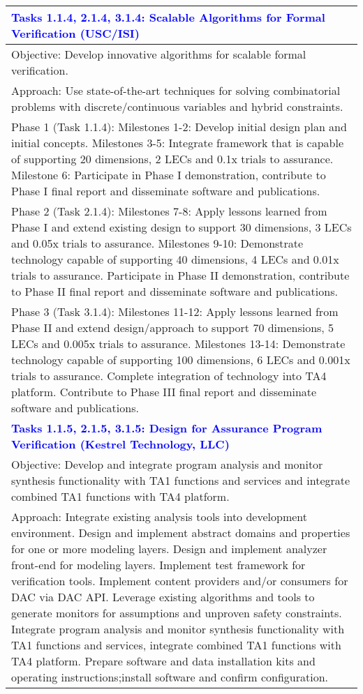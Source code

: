 {\begin{longtable} {|p{\textwidth} | }
\textcolor{blue} {\footnotesize {\textbf{Tasks 1.1.4, 2.1.4, 3.1.4: Scalable Algorithms for Formal Verification (USC/ISI)}}} \\ \hline
Objective: Develop innovative algorithms for scalable formal verification. \\ \hline
Approach: Use state-of-the-art techniques for solving combinatorial problems with discrete/continuous variables and hybrid constraints. \\ \hline
Phase 1 (Task 1.1.4): Milestones 1-2: Develop initial design plan and initial concepts. Milestones 3-5: Integrate framework that is capable of supporting 20 dimensions, 2 LECs and 0.1x trials to assurance. Milestone 6: Participate in Phase I demonstration, contribute to Phase I final report and disseminate software and publications. \\ \hline
Phase 2 (Task 2.1.4): Milestones 7-8: Apply lessons learned from Phase I and extend existing design to support 30 dimensions, 3 LECs and 0.05x trials to assurance. Milestones 9-10: Demonstrate technology capable of supporting 40 dimensions, 4 LECs and 0.01x trials to assurance. Participate in Phase II demonstration, contribute to Phase II final report and disseminate software and publications. \\ \hline
Phase 3 (Task 3.1.4): Milestones 11-12: Apply lessons learned from Phase II and extend design/approach to support 70 dimensions, 5 LECs and 0.005x trials to assurance. Milestones 13-14: Demonstrate technology capable of supporting 100 dimensions, 6 LECs and 0.001x trials to assurance. Complete integration of technology into TA4 platform. Contribute to Phase III final report and disseminate software and publications. \\ \hline
\textcolor{blue} {\footnotesize {\textbf{Tasks 1.1.5, 2.1.5, 3.1.5: Design for Assurance Program Verification (Kestrel Technology, LLC)}}} \\ \hline
Objective: Develop and integrate program analysis and monitor synthesis functionality with TA1 functions and services and integrate combined TA1 functions with TA4 platform. \\ \hline
Approach: Integrate existing analysis tools into development environment.  Design and implement abstract domains and properties for one or more modeling layers.  Design and implement analyzer front-end for modeling layers.  Implement test framework for verification tools.  Implement content providers and/or consumers for DAC via DAC API.  Leverage existing algorithms and tools to generate monitors for assumptions and unproven safety constraints. Integrate program analysis and monitor synthesis functionality with TA1 functions and services, integrate combined TA1 functions with TA4 platform.   Prepare software and data installation kits and operating instructions;install software and confirm configuration. \\ \hline

\end{longtable}}
